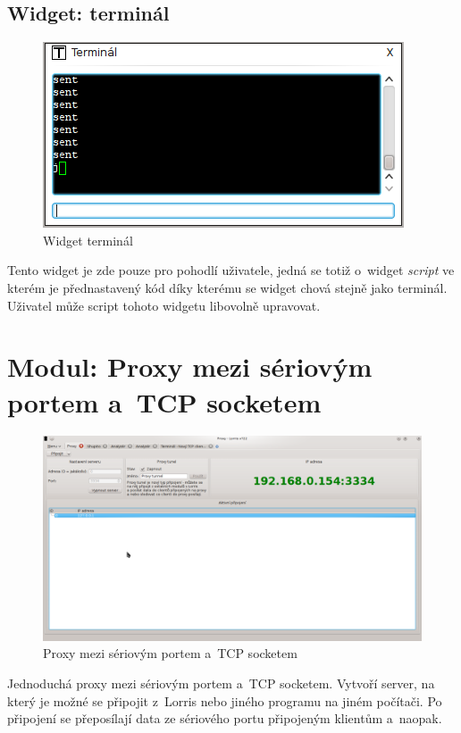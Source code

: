 \documentclass[12pt, a4paper, oneside]{article}
\newcommand{\It}{\textit}  %
\begin{document}
\subsection{Widget: terminál}
\begin{figure}[H]
\begin{center}
\includegraphics[scale=0.70]{img/w_terminal.png}
\caption{Widget terminál}
\end{center}
\end{figure}
Tento widget je zde pouze pro pohodlí uživatele, jedná se totiž o~widget \It{script} ve kterém je přednastavený kód díky kterému se widget chová stejně jako terminál. Uživatel může script tohoto widgetu libovolně upravovat.

\newpage
\setlength{\voffset}{0mm} %
\pagestyle{plain}
\section{Modul: Proxy mezi sériovým portem a~TCP socketem}
\begin{figure}[H]
\begin{center}
\includegraphics[width=\textwidth]{img/proxy.png}
\caption{Proxy mezi sériovým portem a~TCP socketem}
\label{Shupito}
\end{center}
\end{figure}
Jednoduchá proxy mezi sériovým portem a~TCP socketem. Vytvoří server, na který je možné se připojit z~Lorris nebo jiného programu na jiném počítači. Po připojení se přeposílají data ze sériového portu připojeným klientům a~naopak.
\end{document}
